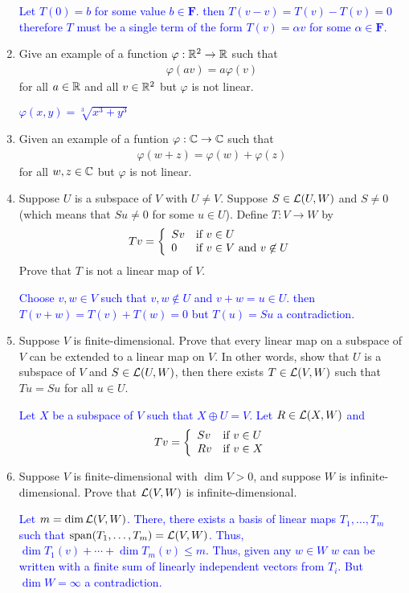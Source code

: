 \documentclass[10pt,a4paper]{report}
\newcommand{\BLUE}[1]{\textcolor{blue}{#1}}
\newcommand{\F}{\textbf{F}}
\begin{document}
\begin{enumerate}
\BLUE{Let $T(0) = b$ for some value $b \in \F$.  then $T(v-v)= T(v)-T(v)=0$ therefore $T$ must be a single term of the form $T(v)=\alpha v$ for some $\alpha \in \F$.
}

\item Give an example of a function $\varphi : \mathbb{R}^2\to\mathbb{R}$ such that
\begin{align*}
	\varphi(av)=a\varphi(v)
\end{align*} for all $a \in \mathbb{R}$ and all $v \in \mathbb{R}^2$ but $\varphi$ is not linear.

\BLUE{$\varphi(x,y)=\sqrt[3]{x^3+y^3}$}

\item Given an example of a funtion $\varphi:\mathbb{C} \to \mathbb{C}$ such that
\begin{align*}
	\varphi(w+z)=\varphi(w)+\varphi(z)
\end{align*}for all $w,z\in\mathbb{C}$ but $\varphi$ is not linear.

\item Suppose $U$ is a subspace of $V$ with $U\ne V$.  Suppose $S \in \mathcal{L}(U,W)$ and $S \ne 0$ (which means that $Su \ne 0$ for some $u\in U$).  Define $T: V \to W$ by
\begin{align*}
	Tv=\left \{ \begin{array}{ll} Sv & \text{if } v \in U\\ 0 & \text{if }v \in V\text{ and } v \not \in U \end{array} \right .
\end{align*}Prove that $T$ is not a linear map of $V$.

\BLUE{Choose $v,w \in V$ such that $v,w \not \in U$ and $v+w=u \in U$. then $T(v+w)=T(v)+T(w)=0$ but $T(u)=Su$ a contradiction.
}

\item Suppose $V$ is finite-dimensional.  Prove that every linear map on a subspace of $V$ can be extended to a linear map on $V$.  In other words, show that $U$ is a subspace of $V$ and $S \in \mathcal{L}(U,W)$, then there exists $T\in \mathcal{L}(V,W)$ such that $Tu=Su$ for all $u\in U$.

\BLUE{Let $X$ be a subspace of $V$ such that $X \oplus U=V$.  Let $R\in \mathcal{L}(X,W)$ and 
\begin{align*}
	Tv = \left \{ \begin{array}{ll} Sv & \text{if } v \in U\\ Rv & \text{if } v \in X \end{array} \right .
\end{align*}
}

\item Suppose $V$ is finite-dimensional with $\dim V > 0$, and suppose $W$ is infinite-dimensional.  Prove that $\mathcal{L}(V,W)$ is infinite-dimensional.

\BLUE{Let $m=\dim \mathcal{L}(V,W)$.  There, there exists a basis of linear maps $T_1, \dots, T_m$ such that $\operatorname{span}(T_1,\dots, T_m) = \mathcal{L}(V,W)$.  Thus, $\dim T_1(v)+\cdots+\dim T_m(v) \le m$.  Thus, given any $w \in W$ $w$ can be written with a finite sum of linearly independent vectors from $T_i$.  But $\dim W = \infty$  a contradiction.
}


\end{enumerate}
\end{document}
